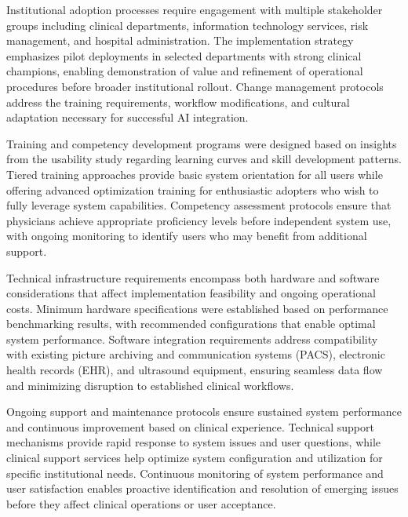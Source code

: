 Institutional adoption processes require engagement with multiple stakeholder groups including clinical departments, information technology services, risk management, and hospital administration. The implementation strategy emphasizes pilot deployments in selected departments with strong clinical champions, enabling demonstration of value and refinement of operational procedures before broader institutional rollout. Change management protocols address the training requirements, workflow modifications, and cultural adaptation necessary for successful AI integration.

Training and competency development programs were designed based on insights from the usability study regarding learning curves and skill development patterns. Tiered training approaches provide basic system orientation for all users while offering advanced optimization training for enthusiastic adopters who wish to fully leverage system capabilities. Competency assessment protocols ensure that physicians achieve appropriate proficiency levels before independent system use, with ongoing monitoring to identify users who may benefit from additional support.

Technical infrastructure requirements encompass both hardware and software considerations that affect implementation feasibility and ongoing operational costs. Minimum hardware specifications were established based on performance benchmarking results, with recommended configurations that enable optimal system performance. Software integration requirements address compatibility with existing picture archiving and communication systems (PACS), electronic health records (EHR), and ultrasound equipment, ensuring seamless data flow and minimizing disruption to established clinical workflows.

Ongoing support and maintenance protocols ensure sustained system performance and continuous improvement based on clinical experience. Technical support mechanisms provide rapid response to system issues and user questions, while clinical support services help optimize system configuration and utilization for specific institutional needs. Continuous monitoring of system performance and user satisfaction enables proactive identification and resolution of emerging issues before they affect clinical operations or user acceptance.
